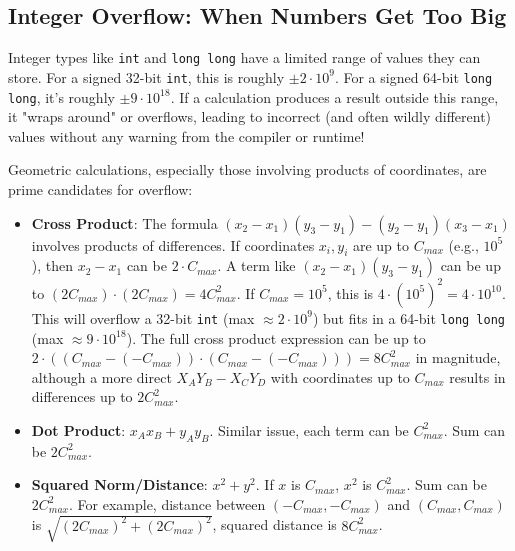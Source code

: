 \subsection{Integer Overflow: When Numbers Get Too Big}
\label{ssec:A.3.2}

\begin{intuition}
\label{intuition:A.3.2.int_limits}
Integer types like \texttt{int} and \texttt{long long} have a limited range of values they can store. For a signed 32-bit \texttt{int}, this is roughly $\pm 2 \cdot 10^9$. For a signed 64-bit \texttt{long long}, it's roughly $\pm 9 \cdot 10^{18}$. If a calculation produces a result outside this range, it "wraps around" or overflows, leading to incorrect (and often wildly different) values without any warning from the compiler or runtime!
\end{intuition}

\begin{warning}
\label{warn:A.3.2.geo_overflow}
Geometric calculations, especially those involving products of coordinates, are prime candidates for overflow:
\begin{itemize}
    \item \textbf{Cross Product}: The formula $(x_2-x_1)(y_3-y_1) - (y_2-y_1)(x_3-x_1)$ involves products of differences. If coordinates $x_i, y_i$ are up to $C_{max}$ (e.g., $10^5$), then $x_2-x_1$ can be $2 \cdot C_{max}$. A term like $(x_2-x_1)(y_3-y_1)$ can be up to $(2 C_{max}) \cdot (2 C_{max}) = 4 C_{max}^2$. If $C_{max}=10^5$, this is $4 \cdot (10^5)^2 = 4 \cdot 10^{10}$. This will overflow a 32-bit \texttt{int} (max $\approx 2 \cdot 10^9$) but fits in a 64-bit \texttt{long long} (max $\approx 9 \cdot 10^{18}$). The full cross product expression can be up to $2 \cdot ( (C_{max}-(-C_{max})) \cdot (C_{max}-(-C_{max})) ) = 8 C_{max}^2$ in magnitude, although a more direct $X_A Y_B - X_C Y_D$ with coordinates up to $C_{max}$ results in differences up to $2 C_{max}^2$.
    \item \textbf{Dot Product}: $x_A x_B + y_A y_B$. Similar issue, each term can be $C_{max}^2$. Sum can be $2 C_{max}^2$.
    \item \textbf{Squared Norm/Distance}: $x^2 + y^2$. If $x$ is $C_{max}$, $x^2$ is $C_{max}^2$. Sum can be $2 C_{max}^2$. For example, distance between $(-C_{max}, -C_{max})$ and $(C_{max}, C_{max})$ is $\sqrt{(2C_{max})^2 + (2C_{max})^2}$, squared distance is $8 C_{max}^2$.
\end{itemize}
\end{warning}

